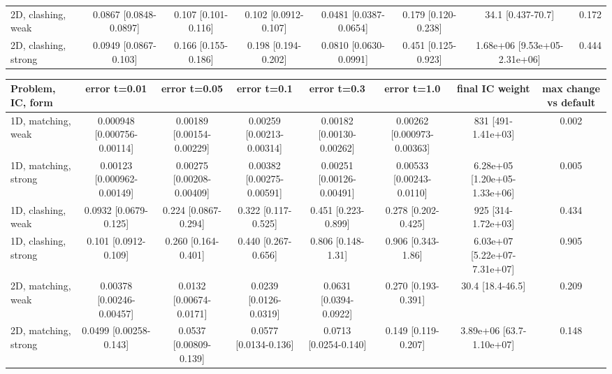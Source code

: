 \begin{tabular}{lccccccc}
2D, clashing, weak & 0.0867 {\scriptsize[0.0848-0.0897]} & 0.107 {\scriptsize[0.101-0.116]} & 0.102 {\scriptsize[0.0912-0.107]} & 0.0481 {\scriptsize[0.0387-0.0654]} & 0.179 {\scriptsize[0.120-0.238]} & 34.1 {\scriptsize[0.437-70.7]} & 0.172 \\
2D, clashing, strong & 0.0949 {\scriptsize[0.0867-0.103]} & 0.166 {\scriptsize[0.155-0.186]} & 0.198 {\scriptsize[0.194-0.202]} & 0.0810 {\scriptsize[0.0630-0.0991]} & 0.451 {\scriptsize[0.125-0.923]} & 1.68e+06 {\scriptsize[9.53e+05-2.31e+06]} & 0.444 \\
\bottomrule
\end{tabular}

\begin{tabular}{lccccccc}
\toprule
Problem, IC, form & error t=0.01 & error t=0.05 & error t=0.1 & error t=0.3 & error t=1.0 & final IC weight & max change vs default \\
\midrule
1D, matching, weak & 0.000948 {\scriptsize[0.000756-0.00114]} & 0.00189 {\scriptsize[0.00154-0.00229]} & 0.00259 {\scriptsize[0.00213-0.00314]} & 0.00182 {\scriptsize[0.00130-0.00262]} & 0.00262 {\scriptsize[0.000973-0.00363]} & 831 {\scriptsize[491-1.41e+03]} & 0.002 \\
1D, matching, strong & 0.00123 {\scriptsize[0.000962-0.00149]} & 0.00275 {\scriptsize[0.00208-0.00409]} & 0.00382 {\scriptsize[0.00275-0.00591]} & 0.00251 {\scriptsize[0.00126-0.00491]} & 0.00533 {\scriptsize[0.00243-0.0110]} & 6.28e+05 {\scriptsize[1.20e+05-1.33e+06]} & 0.005 \\
1D, clashing, weak & 0.0932 {\scriptsize[0.0679-0.125]} & 0.224 {\scriptsize[0.0867-0.294]} & 0.322 {\scriptsize[0.117-0.525]} & 0.451 {\scriptsize[0.223-0.899]} & 0.278 {\scriptsize[0.202-0.425]} & 925 {\scriptsize[314-1.72e+03]} & 0.434 \\
1D, clashing, strong & 0.101 {\scriptsize[0.0912-0.109]} & 0.260 {\scriptsize[0.164-0.401]} & 0.440 {\scriptsize[0.267-0.656]} & 0.806 {\scriptsize[0.148-1.31]} & 0.906 {\scriptsize[0.343-1.86]} & 6.03e+07 {\scriptsize[5.22e+07-7.31e+07]} & 0.905 \\
2D, matching, weak & 0.00378 {\scriptsize[0.00246-0.00457]} & 0.0132 {\scriptsize[0.00674-0.0171]} & 0.0239 {\scriptsize[0.0126-0.0319]} & 0.0631 {\scriptsize[0.0394-0.0922]} & 0.270 {\scriptsize[0.193-0.391]} & 30.4 {\scriptsize[18.4-46.5]} & 0.209 \\
2D, matching, strong & 0.0499 {\scriptsize[0.00258-0.143]} & 0.0537 {\scriptsize[0.00809-0.139]} & 0.0577 {\scriptsize[0.0134-0.136]} & 0.0713 {\scriptsize[0.0254-0.140]} & 0.149 {\scriptsize[0.119-0.207]} & 3.89e+06 {\scriptsize[63.7-1.10e+07]} & 0.148 \\

\end{tabular}
